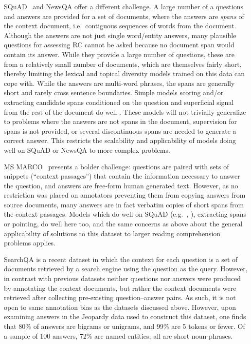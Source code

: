 \documentclass[11pt,letterpaper]{article}
\begin{document}
SQuAD~\cite{squad} and NewsQA \cite{maluuba-NewsQA} offer a different challenge. A large number of a questions and answers are provided for a set of documents, where the answers are \emph{spans} of the context document, i.e.~contiguous sequences of words from the document. Although the answers are not just single word/entity answers, many plausible questions for assessing RC cannot be asked because no document span would contain its answer.
While they provide a large number of questions, these are from a relatively small number of documents, which are themselves fairly short, thereby limiting the lexical and topical diversity models trained on this data can cope with. While the answers are multi-word phrases, the spans are generally short
and rarely cross sentence boundaries.
Simple models scoring and/or extracting candidate spans conditioned on the question and superficial signal from the rest of the document do well
\cite[e.g.]{seo2016bidirectional}.
These models will not trivially generalize to problems where the answers are not spans in the document, supervision for spans is not provided, or several discontinuous spans are needed to generate a correct answer.
This restricts the scalability and applicability of models doing well on SQuAD or NewsQA to more complex problems.

MS MARCO~\cite{msmarco} presents a bolder challenge: questions are paired with sets of snippets (``context passages'') that contain the information necessary to answer the question,
and answers are free-form human generated text. However, as no restriction was placed on annotators preventing them from copying answers from source documents, many answers are in fact verbatim copies of short spans from the context passages.
Models which do well on SQuAD (e.g.\ , ), extracting spans or pointing, do well here too, and the same concerns as above about the general applicability of solutions to this dataset to larger reading comprehension problems applies.

SearchQA \cite{dunn2017searchqa} is a recent dataset in which the context for each question is a set of documents retrieved by a search engine using the question as the query. However, in contrast with previous datasets neither questions nor answers were produced by annotating the context documents, but rather the context documents were retrieved after collecting pre-existing question--answer pairs.
As such, it is not open to same annotation bias as the datasets discussed above. However, upon examining answers in the Jeopardy data used to construct this dataset, one finds that 80\% of answers are bigrams or unigrams, and 99\% are 5 tokens or fewer. Of a sample of 100 answers, 72\% are named entities, all are short noun-phrases.
\end{document}
